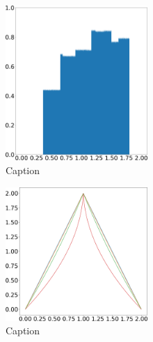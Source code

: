 \begin{figure}[H]
    \includegraphics[width=0.48\textwidth]{figure/tent_squashed_physical_density_0.2.png}
    \caption{Caption}
    \label{fig:tent_squashed_shadow}
\end{figure}

\begin{figure}[H]
    \centering
    \includegraphics[width=0.48\textwidth]{figure/pinched_tent_map.png}
    \caption{Caption}
    \label{fig:tent_pinched}
\end{figure}

